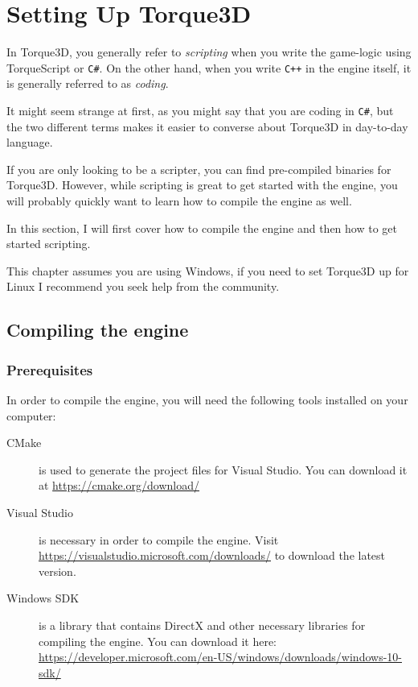 

\chapter{Setting Up Torque3D}
\label{cha:t3d-setup}

In Torque3D, you generally refer to \textit{scripting} when you write the game-logic using TorqueScript or \texttt{C\#}. On the other hand, when you write \texttt{C++} in the engine itself, it is generally referred to as \textit{coding}.

It might seem strange at first, as you might say that you are coding in \texttt{C\#}, but the two different terms makes it easier to converse about Torque3D in day-to-day language.

If you are only looking to be a scripter, you can find pre-compiled binaries for Torque3D. However, while scripting is great to get started with the engine, you will probably quickly want to learn how to compile the engine as well.

In this section, I will first cover how to compile the engine and then how to get started scripting. 

\begin{remark}
	This chapter assumes you are using Windows, if you need to set Torque3D up for Linux I recommend you seek help from the community.
\end{remark}

\section{Compiling the engine}
\subsection{Prerequisites}

In order to compile the engine, you will need the following tools installed on your computer:
\begin{description}
	\item[CMake] is used to generate the project files for Visual Studio. You can download it at \url{https://cmake.org/download/}
	\item[Visual Studio] is necessary in order to compile the engine.
	Visit \url{https://visualstudio.microsoft.com/downloads/} to download the latest version.
	\item[Windows SDK] is a library that contains DirectX and other necessary libraries for compiling the engine. You can download it here: \url{https://developer.microsoft.com/en-US/windows/downloads/windows-10-sdk/}
\end{description}

